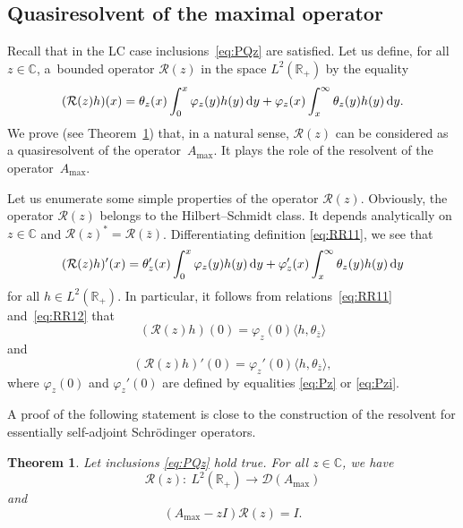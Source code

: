 \documentclass[10pt,a4paper]{amsart}
\numberwithin{equation}{section}
\newtheorem{Theorem}{Theorem}[section]
\begin{document}
\subsection{Quasiresolvent of the maximal operator}\label{section3.1}

Recall that in the LC case
 inclusions~\eqref{eq:PQz} are satisfied. Let us define, for all $z\in {\mathbb C}$, a~bounded operator ${\mathcal R} (z)$ in the space $L^2 ({\mathbb R}_{+})$ by the equality
 \begin{equation}
 ( {\mathcal R} (z)h) (x) = \theta_{z} (x) \int_{0}^x \varphi_{z} (y) h(y) \,{\rm d}y+
\varphi_{z} (x) \int_x^\infty \theta_{z} (y) h(y) \,{\rm d} y .
 \label{eq:RR11}\end{equation}
We prove (see Theorem~\ref{res}) that, in a natural sense, ${\mathcal R} (z)$ can be considered as a quasiresolvent of the operator~$A_{\max}$. It plays the role of the resolvent of the operator~$A_{\max}$.

Let us enumerate some simple properties of the operator ${\mathcal R} (z)$.
 Obviously, the operator ${\mathcal R} (z)$ belongs to the Hilbert--Schmidt class. It depends analytically on $z\in {\mathbb C}$ and ${\mathcal R} (z)^*={\mathcal R} (\bar{z})$. Differentiating
 definition \eqref{eq:RR11}, we see that
 \begin{equation}
 ( {\mathcal R} (z)h)' (x) = \theta_{z}' (x) \int_{0}^x \varphi_{z} (y) h(y) \,{\rm d}y+
 \varphi_{z}' (x) \int_x^\infty \theta_{z} (y) h(y) \,{\rm d}y
 \label{eq:RR12}\end{equation}
 for all $h\in L^2 ({\mathbb R}_{+})$.
 In particular, it follows from relations~\eqref{eq:RR11} and~\eqref{eq:RR12} that
 \begin{equation}
({\mathcal R} (z)h)(0)= \varphi_{z} (0)\langle h, \theta_{\bar{z}}\rangle
\label{eq:r01}\end{equation}
and
 \begin{equation}
({\mathcal R} (z)h)'(0)= \varphi_{z}' (0)\langle h, \theta_{\bar{z}}\rangle,
\label{eq:r02}\end{equation}
where $\varphi_{z} (0)$ and $\varphi_{z}' (0)$ are defined by equalities \eqref{eq:Pz} or \eqref{eq:Pzi}.


A proof of the following statement is close to the construction of the resolvent for essentially self-adjoint Schr\"odinger operators.

 \begin{Theorem}\label{res}
 Let inclusions \eqref{eq:PQz} hold true.
 For all $z \in {\mathbb C}$, we have
 \begin{equation}
{\mathcal R} (z)\colon \ L^2 ({\mathbb R}_{+})\to {\mathcal D} (A_{\max} )
\label{eq:qres}\end{equation}
and
 \begin{equation}
(A_{\max} -zI) {\mathcal R} (z)=I.
\label{eq:qres1}\end{equation}
 \end{Theorem}
\end{document}

